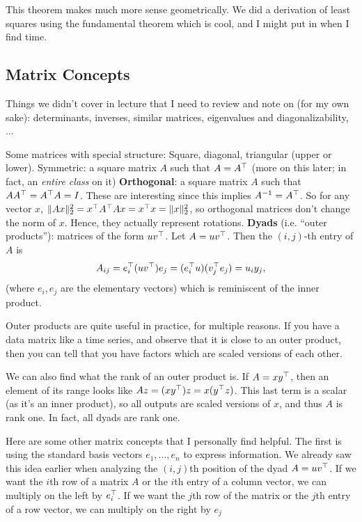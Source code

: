 \documentclass[11 pt]{scrartcl}
\begin{document}
This theorem makes much more sense geometrically. 
We did a derivation of least squares using the fundamental theorem which is cool, and I might put in when I find time. 

\subsection{Matrix Concepts}
Things we didn't cover in lecture that I need to review and note on (for my own sake): determinants, inverses, similar matrices, eigenvalues and diagonalizability, ... 

Some matrices with special structure: 
\itemnum
    \ii Square, diagonal, triangular (upper or lower). 
    \ii Symmetric: a square matrix $A$ such that $A = A^\top$ (more on this later; in fact, an \emph{entire class} on it)
    \ii \textbf{Orthogonal}: a square matrix $A$ such that $AA^\top = A^\top A = I$. 
    These are interesting since this implies $A^{-1} = A^\top$. 
    So for any vector $x$, $\|Ax\|_2^2 = x^\top A^\top Ax = x^\top x = \|x\|_2^2$, so orthogonal matrices don't change the norm of $x$. 
    Hence, they actually represent rotations. 
    \ii \textbf{Dyads} (i.e. ``outer products''): matrices of the form $uv^\top$. 
    Let $A = uv^\top$. Then the $(i,j)$-th entry of $A$ is 
    \[ A_{ij} = e_i^\top(uv^\top) e_j = (e_i^\top u)(v_j^\top e_j) = u_iy_j,\] 
    (where $e_i, e_j$ are the elementary vectors) which is reminiscent of the inner product. 
\itemend

Outer products are quite useful in practice, for multiple reasons. 
If you have a data matrix like a time series, and observe that it is close to an outer product, then you can tell that you have factors which are scaled versions of each other. 

We can also find what the rank of an outer product is. 
If $A = xy^\top$, then an element of its range looks like $Az = (xy^\top)z = x(y^\top z)$. 
This last term is a scalar (as it's an inner product), so all outputs are scaled versions of $x$, and thus $A$ is rank one. 
In fact, all dyads are rank one. 

Here are some other matrix concepts that I personally find helpful.
The first is using the standard basis vectors $e_1, \dots, e_n$ to express information. 
We already saw this idea earlier when analyzing the $(i,j)$th position of the dyad $A = uv^\top$. 
If we want the $i$th row of a matrix $A$ or the $i$th entry of a column vector, we can multiply on the left by $e_i^\top$.
If we want the $j$th row of the matrix or the $j$th entry of a row vector, we can multiply on the right by $e_j$
\end{document}
